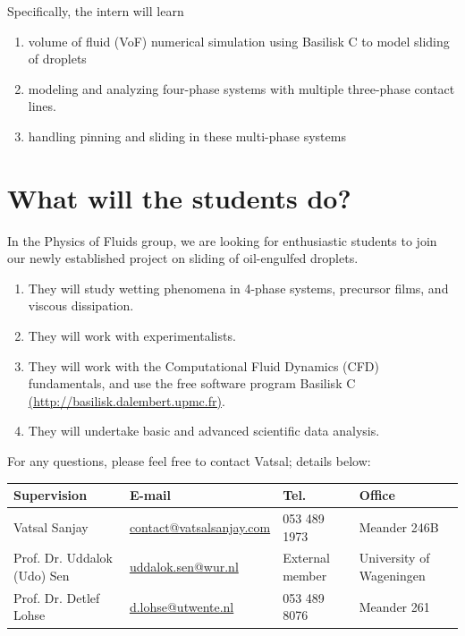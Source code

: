 \documentclass[a4paper,10pt]{article}
\begin{document}
\noindent Specifically, the intern will learn

\begin{enumerate}
	\item volume of fluid (VoF) numerical simulation using Basilisk C to model sliding of droplets
	\item modeling and analyzing four-phase systems with multiple three-phase contact lines. 
	\item handling pinning and sliding in these multi-phase systems
\end{enumerate}


\section*{What will the students do?}
In the Physics of Fluids group, we are looking for enthusiastic students to join our newly established project on sliding of oil-engulfed droplets.
\begin{enumerate}
	\item They will study wetting phenomena in 4-phase systems, precursor films, and viscous dissipation. 
	\item They will work with experimentalists. 
	\item They will work with the Computational Fluid Dynamics (CFD) fundamentals, and use the free software program Basilisk C \href{http://basilisk.dalembert.upmc.fr}{(http://basilisk.dalembert.upmc.fr)}.
	\item They will undertake basic and advanced scientific data analysis.
\end{enumerate}


For any questions, please feel free to contact Vatsal; details below: 

\begin{center}
	\begin{tabular}{|l|l|l|l|}
		\hline \textbf{Supervision} & \textbf{E-mail} & \textbf{Tel.} & \textbf{Office} \\ 
		\hline Vatsal Sanjay & \href{mailto:contact@vatsalsanjay.com}{contact@vatsalsanjay.com} & 053 489 1973 & Meander 246B \\ 
		\hline Prof. Dr. Uddalok (Udo) Sen & \href{mailto:uddalok.sen@wur.nl }{uddalok.sen@wur.nl} & External member & University of Wageningen \\ 
		\hline Prof. Dr. Detlef Lohse & \href{mailto:d.lohse@utwente.nl}{d.lohse@utwente.nl} & 053 489 8076 & Meander 261 \\ 
		\hline 
	\end{tabular} 
\end{center}



\end{document}
